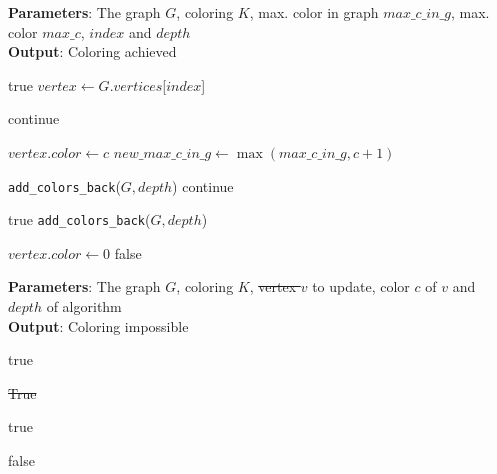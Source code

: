 \documentclass{article}
\providecommand{\DIFaddtex}[1]{{\protect\color{blue}\uwave{#1}}} %
\providecommand{\DIFdeltex}[1]{{\protect\color{red}\sout{#1}}}                      %
\providecommand{\DIFaddbegin}{} %
\providecommand{\DIFaddend}{} %
\providecommand{\DIFdelbegin}{} %
\providecommand{\DIFdelend}{} %
\providecommand{\DIFadd}[1]{\texorpdfstring{\DIFaddtex{#1}}{#1}} %
\providecommand{\DIFdel}[1]{\texorpdfstring{\DIFdeltex{#1}}{}} %
\newcommand{\DIFscaledelfig}{0.5}
\newlength{\DIFdelgraphicswidth} %
\newlength{\DIFdelgraphicsheight} %
\newcommand{\DIFaddincludegraphics}[2][]{{\color{blue}\fbox{\DIFOincludegraphics[#1]{#2}}}} %
\newcommand{\DIFdelincludegraphics}[2][]{%
\sbox{\DIFdelgraphicsbox}{\DIFOincludegraphics[#1]{#2}}%
\settoboxwidth{\DIFdelgraphicswidth}{\DIFdelgraphicsbox} %
\settoboxtotalheight{\DIFdelgraphicsheight}{\DIFdelgraphicsbox} %
\scalebox{\DIFscaledelfig}{%
\parbox[b]{\DIFdelgraphicswidth}{\usebox{\DIFdelgraphicsbox}\\[-\baselineskip] \rule{\DIFdelgraphicswidth}{0em}}\llap{\resizebox{\DIFdelgraphicswidth}{\DIFdelgraphicsheight}{%
\setlength{\unitlength}{\DIFdelgraphicswidth}%
\begin{picture}(1,1)%
\thicklines\linethickness{2pt} %
{\color[rgb]{1,0,0}\put(0,0){\framebox(1,1){}}}%
{\color[rgb]{1,0,0}\put(0,0){\line( 1,1){1}}}%
{\color[rgb]{1,0,0}\put(0,1){\line(1,-1){1}}}%
\end{picture}%
}\hspace*{3pt}}} %
} %
\DeclareRobustCommand{\DIFaddbegin}{\DIFOaddbegin \let\includegraphics\DIFaddincludegraphics} %
\DeclareRobustCommand{\DIFaddend}{\DIFOaddend \let\includegraphics\DIFOincludegraphics} %
\DeclareRobustCommand{\DIFdelbegin}{\DIFOdelbegin \let\includegraphics\DIFdelincludegraphics} %
\DeclareRobustCommand{\DIFdelend}{\DIFOaddend \let\includegraphics\DIFOincludegraphics} %
\begin{document}
\begin{algorithm}[tb]
	\caption{\texttt{can\_color\_with\_max\_c}}
	\label{alg:check}
	\textbf{Parameters}: The graph $G$, coloring $K$, max. color in graph $max\_c\_in\_g$, max. color $max\_c$, $index$ and $depth$\\
	\textbf{Output}: Coloring achieved
	\begin{algorithmic}[1]
		\RETURN true
		\ENDIF
		\STATE $vertex \gets G.vertices$[$index$]

		\STATE continue
		\ENDIF

		\STATE $vertex.color \gets c$
		\STATE $new\_max\_c\_in\_g \gets \max(max\_c\_in\_g, c + 1)$


		\STATE \texttt{add\_colors\_back}($G, depth$)
		\STATE continue
		\ENDIF
		\DIFdelbegin %
\DIFdelend \DIFaddbegin {}
		\DIFaddend 

		\RETURN true
		\ENDIF
		\STATE \texttt{add\_colors\_back}($G, depth$)

		\ENDFOR

		\STATE $vertex.color \gets 0$
		\RETURN false
	\end{algorithmic}
\end{algorithm}

\begin{algorithm}[tb]
	\caption{\texttt{update\_neighbors}}
	\label{alg:updateN}
	\textbf{Parameters}: The graph $G$, coloring $K$, \DIFdelbegin \DIFdel{vertex $v$ }\DIFdelend \DIFaddbegin \DIFadd{$vertex$ }\DIFaddend to update, color $c$ of \DIFdelbegin \DIFdel{$v$ }\DIFdelend \DIFaddbegin \DIFadd{$vertex$ }\DIFaddend and $depth$ of algorithm \\
	\textbf{Output}: Coloring impossible
	\begin{algorithmic}[1]



		\RETURN true 
		\ENDIF
		\ENDIF


		\RETURN \DIFdelbegin \DIFdel{True
		}\DIFdelend \DIFaddbegin \DIFadd{true
		}\DIFaddend {}

		\RETURN true

		\ENDIF
		\ENDIF
		\ENDFOR
		\RETURN false
	\end{algorithmic}
\end{algorithm}
\end{document}

